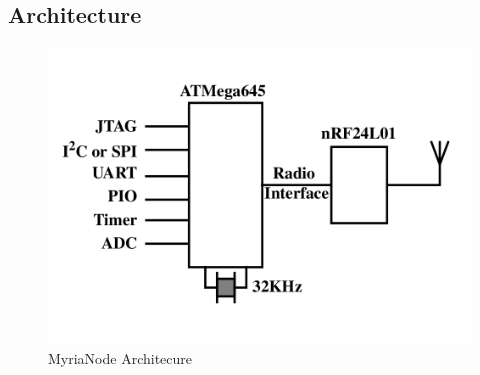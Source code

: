 \documentclass[a4paper,11pt]{report}
\begin{document}
\subsection{Architecture}
\begin{figure}[!h]
 \centering
 \includegraphics[width=0.5 \textwidth]{myrianodearch}
\caption{MyriaNode Architecure}
\label{myrianodearch}
\end{figure}
\end{document}
